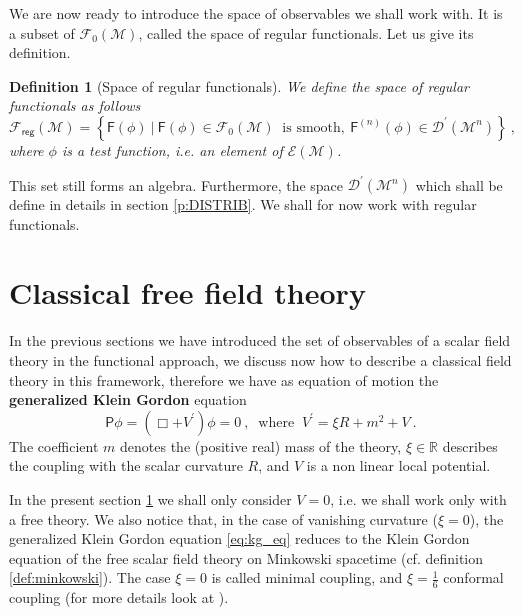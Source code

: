 \documentclass[11pt]{book}
\newcommand{\Dcal}{\mathcal{D}}
\newcommand{\Ecal}{\mathcal{E}}
\newcommand{\Fcal}{\mathcal{F}}
\newcommand{\Mcal}{\mathcal{M}}
\newcommand{\Rbb}{\mathbb{R}}
\newcommand{\Fsf}{\mathsf{F}}
\newcommand{\Psf}{\mathsf{P}}
\theoremstyle{break}
\newtheorem{definition}{Definition}[chapter]
\begin{document}
We are now ready to introduce the space of observables we shall work with. It is a subset of $\Fcal_0(\Mcal)$, called the space of regular functionals. Let us give its definition.


\begin{definition}[Space of regular functionals]\label{def:obs_reg}
We define the space of regular functionals as follows
%
\begin{equation*}
\Fcal_{\mathsf{reg}}(\Mcal) = \left\{ \Fsf(\phi) \ \bigg| \ \Fsf(\phi) \in \Fcal_0(\Mcal) \ \mbox{ is smooth}, \ \Fsf^{(n)}(\phi) \in \Dcal^\prime(\Mcal^{n}) \right\} \ ,
\end{equation*}
%
where $\phi$ is a test function, i.e. an element of $\Ecal(\Mcal)$.
\end{definition}

This set still forms an algebra. Furthermore, the space $\Dcal^\prime(\Mcal^{n})$ which shall be define in details in section \ref{p:DISTRIB}. We shall for now work with regular functionals. 


\section{Classical free field theory}\label{p:CLASSICAL}


In the previous sections we have introduced the set of observables of a scalar field theory in the functional approach, we discuss now how to describe a classical field theory in this framework, therefore we have as equation of motion the \textbf{generalized Klein Gordon} equation
%
\begin{equation} 
\Psf \phi = \left( \Box + V^\prime \right) \phi = 0 \ , \
\mbox{ where } \ V^\prime = \xi R + m^2 + V \ . 
\label{eq:kg_eq}
\end{equation}
%
The coefficient $m$ denotes the (positive real) mass of the theory, $\xi \in \Rbb$ describes the coupling with the scalar curvature $R$, and $V$ is a non linear local potential.


In the present section \ref{p:CLASSICAL} we shall only consider $V=0$, i.e. we shall work only with a free theory. We also notice that, in the case of vanishing curvature ($\xi=0$), the generalized Klein Gordon equation \eqref{eq:kg_eq} reduces to the Klein Gordon equation of the free scalar field theory on Minkowski spacetime (cf. definition \ref{def:minkowski}). The case $\xi=0$ is called minimal coupling, and $\xi=\frac16$ conformal coupling (for more details look at \cite{WALD_1984}).
\end{document}
